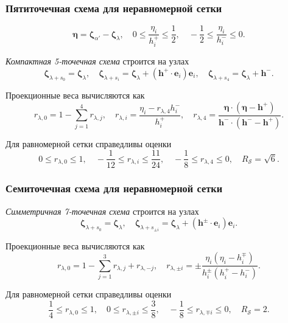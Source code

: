 \documentclass[mathserif]{beamer} %
\newcommand{\bzeta}{\boldsymbol{\zeta}}
\newcommand{\bh}{\boldsymbol{h}}
\newcommand{\be}{\boldsymbol{e}}
\begin{document}
\begin{frame}
    \frametitle{Пятиточечная схема для неравномерной сетки}
    \begin{equation}\label{eq:eta_definition}
        \boldsymbol{\eta} = \bzeta_{\alpha'} - \bzeta_{\lambda}, \quad
        0 \leq \frac{\eta_i}{h^+_i} \leq \frac12, \quad
        -\frac12 \leq \frac{\eta_i}{h^-_i} \leq 0.
    \end{equation}\pause

    \emph{Компактная 5-точечная схема} строится на узлах
    \begin{equation}\label{eq:stencil_nodes_5}
        \bzeta_{\lambda+s_0} = \bzeta_{\lambda}, \quad
        \bzeta_{\lambda+s_i} = \bzeta_{\lambda} + (\bh^+\cdot \be_i)\be_i, \quad
        \bzeta_{\lambda+s_4} = \bzeta_{\lambda} + \bh^-.
    \end{equation}

    Проекционные веса вычисляются как
    \begin{equation}\label{eq:stencil_weights_5}
        r_{\lambda,0} = 1 - \sum_{j=1}^4 r_{\lambda,j}, \quad
        r_{\lambda,i} = \frac{\eta_i - r_{\lambda,4}h^-_i}{h^+_i}, \quad
        r_{\lambda,4} = \frac{\boldsymbol{\eta}\cdot(\boldsymbol{\eta} - \bh^+)}
            {\bh^-\cdot(\bh^- - \bh^+)}.
    \end{equation}
    \vspace{-20pt}\pause

    Для равномерной сетки справедливы оценки
    \begin{equation}\label{eq:weights_ranges_5}
        0 \leq r_{\lambda,0} \leq 1, \quad
        -\frac1{12} \leq r_{\lambda,i} \leq \frac{11}{24}, \quad
        -\frac18 \leq r_{\lambda,4} \leq 0, \quad
        R_\mathcal{S} = \sqrt{6}.
    \end{equation}
\end{frame}

\begin{frame}
    \frametitle{Семиточечная схема для неравномерной сетки}
    \emph{Симметричная 7-точечная схема} строится на узлах
    \begin{equation}\label{eq:stencil_nodes_7}
        \bzeta_{\lambda+s_0} = \bzeta_{\lambda}, \quad
        \bzeta_{\lambda+s_{\pm i}} = \bzeta_{\lambda} + (\bh^\pm\cdot \be_i)\be_i.
    \end{equation}

    Проекционные веса вычисляются как
    \begin{equation}\label{eq:stencil_weights_7}
        r_{\lambda,0} = 1 - \sum_{j=1}^3 r_{\lambda,j} + r_{\lambda,-j}, \quad
        r_{\lambda,\pm i} = \pm\frac{\eta_i(\eta_i - h^\mp_i)}{h^\pm_i(h^+_i-h^-_i)}.
    \end{equation}
    \pause

    Для равномерной сетки справедливы оценки
    \begin{equation}\label{eq:weights_ranges_7}
        \frac14 \leq r_{\lambda,0} \leq 1, \quad
        0 \leq r_{\lambda,\pm i} \leq \frac38, \quad
        -\frac18 \leq r_{\lambda,\mp i} \leq 0, \quad
        R_\mathcal{S} = 2.
    \end{equation}
\end{frame}
\end{document}

